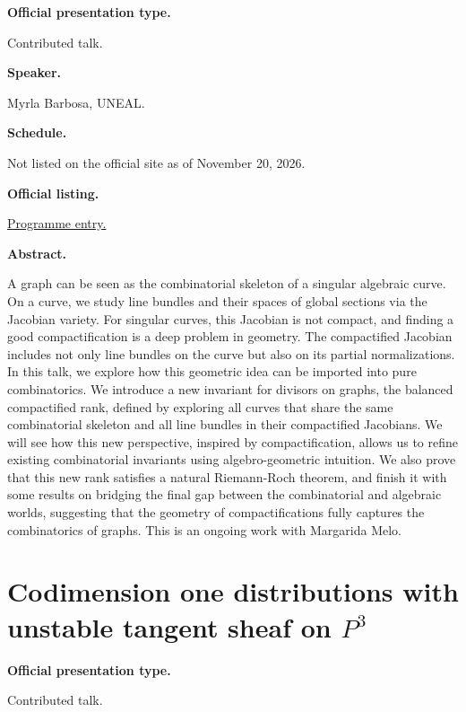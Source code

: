\medskip\noindent
{\bf Official presentation type.}

Contributed talk.

\medskip\noindent
{\bf Speaker.}

Myrla Barbosa, UNEAL.

\medskip\noindent
{\bf Schedule.}

Not listed on the official site as of
November 20, 2026.

\medskip\noindent
{\bf Official listing.}

\href{%
https://sites.google.com/view/%
geoalgcompluff/legal/%
legal-2027-resumos#h.dant8g3oe5ea%
}{Programme entry.}

\medskip\noindent
{\bf Abstract.}

A graph can be seen as the combinatorial
skeleton of a singular algebraic curve. On a
curve, we study line bundles and their spaces
of global sections via the Jacobian variety.
For singular curves, this Jacobian is not
compact, and finding a good compactification
is a deep problem in geometry. The
compactified Jacobian includes not only line
bundles on the curve but also on its partial
normalizations. In this talk, we explore how
this geometric idea can be imported into pure
combinatorics. We introduce a new invariant
for divisors on graphs, the balanced
compactified rank, defined by exploring all
curves that share the same combinatorial
skeleton and all line bundles in their
compactified Jacobians. We will see how this
new perspective, inspired by
compactification, allows us to refine
existing combinatorial invariants using
algebro-geometric intuition. We also prove
that this new rank satisfies a natural
Riemann-Roch theorem, and finish it with some
results on bridging the final gap between the
combinatorial and algebraic worlds,
suggesting that the geometry of
compactifications fully captures the
combinatorics of graphs. This is an ongoing
work with Margarida Melo.

\section{Codimension one distributions with
unstable tangent sheaf on $P^3$}
\label{section-codimension-one-distributions}

\medskip\noindent
{\bf Official presentation type.}

Contributed talk.

